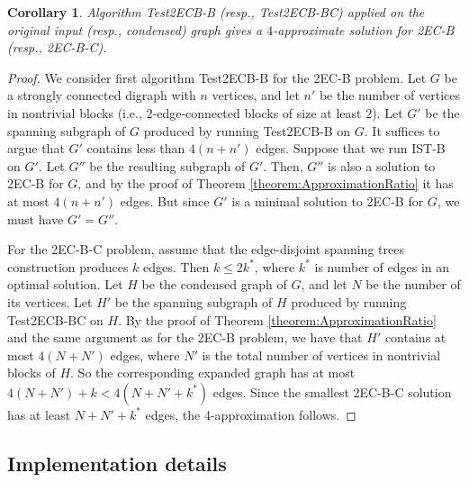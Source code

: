 \documentclass[11pt]{article}
\newtheorem{corollary}[theorem]{Corollary}
\begin{document}
\begin{corollary}
\label{corollary:Test2CB-B}
Algorithm \textsf{Test2ECB-B} (resp., \textsf{Test2ECB-BC}) applied on the original input (resp., condensed) graph gives a $4$-approximate solution for \textsf{2EC-B} (resp., \textsf{2EC-B-C}).
\end{corollary}
\begin{proof}
We consider first algorithm \textsf{Test2ECB-B} for the \textsf{2EC-B} problem.
Let $G$ be a strongly connected digraph with $n$ vertices, and let $n'$ be the number of vertices in nontrivial blocks (i.e., $2$-edge-connected blocks of size at least $2$).
Let $G'$ be the spanning subgraph of $G$ produced by running \textsf{Test2ECB-B} on $G$. It suffices to argue that $G'$ contains less than $4(n+n')$ edges.
Suppose that we run \textsf{IST-B} on $G'$. Let $G''$ be the resulting subgraph of $G'$. Then, $G''$ is also a solution to \textsf{2EC-B} for $G$, and by the proof of Theorem \ref{theorem:ApproximationRatio} it has at most $4(n+n')$ edges. But since $G'$ is a minimal solution to \textsf{2EC-B} for $G$, we must have $G'=G''$.

For the \textsf{2EC-B-C} problem, assume that the edge-disjoint spanning trees construction produces $k$ edges.
Then $k \le 2 k^{\ast}$, where $k^{\ast}$ is number of edges in an optimal solution.
Let $H$ be the condensed graph of $G$, and let $N$ be the number of its vertices.
Let $H'$ be the spanning subgraph of $H$ produced by running \textsf{Test2ECB-BC} on $H$. By the proof of Theorem \ref{theorem:ApproximationRatio} and the same argument as for the \textsf{2EC-B} problem, we have that $H'$  contains at most $4(N+N')$ edges, where $N'$ is the total number of vertices in nontrivial blocks of $H$.
So the corresponding expanded graph has at most $4(N+N')+k < 4(N+N'+k^{\ast})$ edges.
Since the smallest \textsf{2EC-B-C} solution has at least $N+N'+k^{\ast}$ edges, the 4-approximation follows.
\end{proof}


\subsection{Implementation details}
\label{section:IST-implementation}
\end{document}
